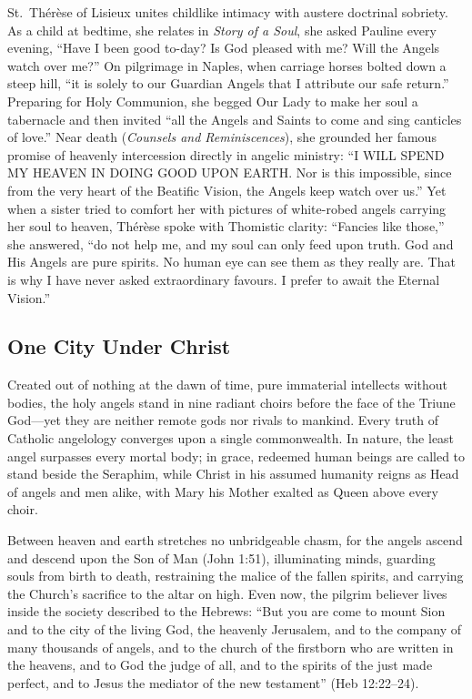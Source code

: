St.~Th\'er\`ese of Lisieux unites childlike intimacy with austere doctrinal sobriety. As a child at bedtime, she relates in \emph{Story of a Soul}, she asked Pauline every evening, ``Have I been good to-day? Is God pleased with me? Will the Angels watch over me?'' On pilgrimage in Naples, when carriage horses bolted down a steep hill, ``it is solely to our Guardian Angels that I attribute our safe return.'' Preparing for Holy Communion, she begged Our Lady to make her soul a tabernacle and then invited ``all the Angels and Saints to come and sing canticles of love.'' Near death (\emph{Counsels and Reminiscences}), she grounded her famous promise of heavenly intercession directly in angelic ministry: ``I WILL SPEND MY HEAVEN IN DOING GOOD UPON EARTH. Nor is this impossible, since from the very heart of the Beatific Vision, the Angels keep watch over us.'' Yet when a sister tried to comfort her with pictures of white-robed angels carrying her soul to heaven, Th\'er\`ese spoke with Thomistic clarity: ``Fancies like those,'' she answered, ``do not help me, and my soul can only feed upon truth. God and His Angels are pure spirits. No human eye can see them as they really are. That is why I have never asked extraordinary favours. I prefer to await the Eternal Vision.''

\subsection{One City Under Christ}

Created out of nothing at the dawn of time, pure immaterial intellects without bodies, the holy angels stand in nine radiant choirs before the face of the Triune God---yet they are neither remote gods nor rivals to mankind. Every truth of Catholic angelology converges upon a single commonwealth. In nature, the least angel surpasses every mortal body; in grace, redeemed human beings are called to stand beside the Seraphim, while Christ in his assumed humanity reigns as Head of angels and men alike, with Mary his Mother exalted as Queen above every choir.

Between heaven and earth stretches no unbridgeable chasm, for the angels ascend and descend upon the Son of Man (John 1:51), illuminating minds, guarding souls from birth to death, restraining the malice of the fallen spirits, and carrying the Church's sacrifice to the altar on high. Even now, the pilgrim believer lives inside the society described to the Hebrews: ``But you are come to mount Sion and to the city of the living God, the heavenly Jerusalem, and to the company of many thousands of angels, and to the church of the firstborn who are written in the heavens, and to God the judge of all, and to the spirits of the just made perfect, and to Jesus the mediator of the new testament'' (Heb 12:22--24).
